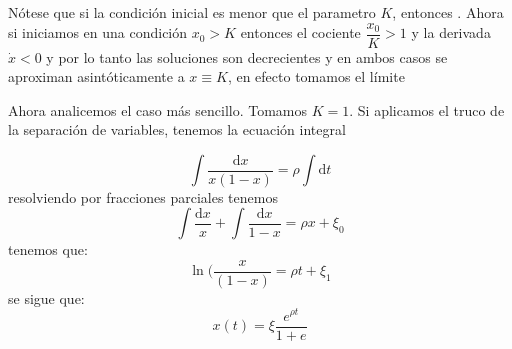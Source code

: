 Nótese que si la condición inicial es menor que el parametro $K$, entonces . Ahora si iniciamos en una condición $x_0 > K$ entonces el cociente $\dfrac{x_0}{K}>1$ y la derivada $\dot{x} < 0$ y por lo tanto las soluciones son decrecientes y en ambos casos se aproximan asintóticamente a $x\equiv K$, en efecto tomamos el límite

Ahora analicemos el caso más sencillo. Tomamos $K=1$. Si aplicamos el truco de la separación de variables, tenemos la ecuación integral

\begin{equation}
    \int \frac{\mathrm{d}x}{x(1-x)}=\rho\int\mathrm{d}t
\end{equation}
resolviendo por fracciones parciales tenemos
$$
\int\frac{\mathrm{d}x}{x}+\int\frac{\mathrm{d}x}{1-x}=\rho x +\xi_0
$$
tenemos que:
$$
\ln(\frac{x}{(1-x)}=\rho t+\xi_1
$$
se sigue que:
$$
x(t)=\xi\frac{e^{\rho t}}{1+e}
$$